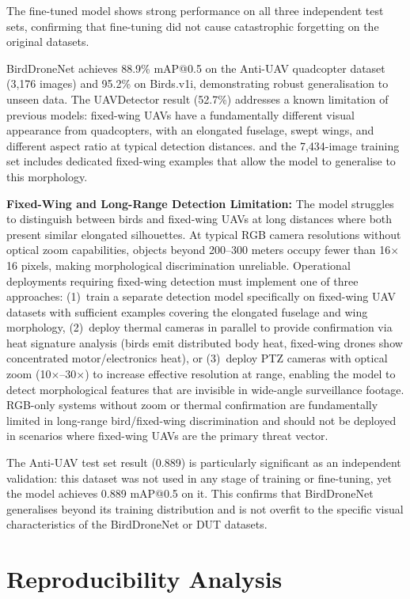 \documentclass[12pt,a4paper]{report}
\begin{document}
The fine-tuned model shows strong performance on all three independent test
sets, confirming that fine-tuning did not cause catastrophic forgetting on
the original datasets.

BirdDroneNet achieves 88.9\% mAP@0.5 on the Anti-UAV quadcopter dataset
(3,176 images) and 95.2\% on Birds.v1i, demonstrating
robust generalisation to unseen data. The UAVDetector result (52.7\%) addresses
a known limitation of previous models: fixed-wing UAVs have a fundamentally
different visual appearance from quadcopters, with an elongated fuselage, swept wings,
and different aspect ratio at typical detection distances. and the 7,434-image
training set includes dedicated fixed-wing examples that allow the model to
generalise to this morphology.

\textbf{Fixed-Wing and Long-Range Detection Limitation:} The model struggles to
distinguish between birds and fixed-wing UAVs at long distances where both present
similar elongated silhouettes. At typical RGB camera resolutions without optical
zoom capabilities, objects beyond 200--300 meters occupy fewer than 16$\times$16
pixels, making morphological discrimination unreliable. Operational deployments
requiring fixed-wing detection must implement one of three approaches: (1)~train
a separate detection model specifically on fixed-wing UAV datasets with sufficient
examples covering the elongated fuselage and wing morphology, (2)~deploy thermal
cameras in parallel to provide confirmation via heat signature analysis (birds emit
distributed body heat, fixed-wing drones show concentrated motor/electronics heat),
or (3)~deploy PTZ cameras with optical zoom (10$\times$--30$\times$) to increase
effective resolution at range, enabling the model to detect morphological features
that are invisible in wide-angle surveillance footage. RGB-only systems without
zoom or thermal confirmation are fundamentally limited in long-range bird/fixed-wing
discrimination and should not be deployed in scenarios where fixed-wing UAVs are
the primary threat vector.

The Anti-UAV test set result (0.889) is particularly significant as an
independent validation: this dataset was not used in any stage of training
or fine-tuning, yet the model achieves 0.889 mAP@0.5 on it. This confirms
that BirdDroneNet generalises beyond its training distribution and is
not overfit to the specific visual characteristics of the BirdDroneNet
or DUT datasets.

\section{Reproducibility Analysis}
\end{document}
